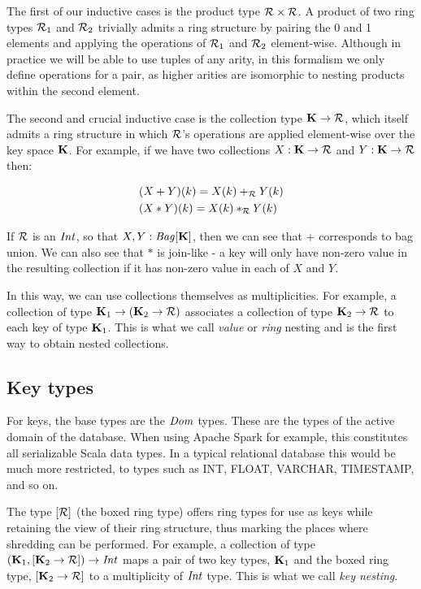 {{The first of our inductive cases is the product type $\mathcal{R} \times \mathcal{R}$. A product of two ring types $\mathcal{R}_1$ and $\mathcal{R}_2$ trivially admits a ring structure by pairing the 0 and 1 elements and applying the operations of $\mathcal{R}_1$ and $\mathcal{R}_2$ element-wise. Although in practice we will be able to use tuples of any arity, in this formalism we only define operations for a pair, as higher arities are isomorphic to nesting products within the second element.

The second and crucial inductive case is the collection type $\mathbf{K} \rightarrow \mathcal{R}$, which itself admits a ring structure in which $\mathcal{R}$'s operations are applied element-wise over the key space $\mathbf{K}$. For example, if we have two collections $X: \mathbf{K} \rightarrow \mathcal{R}$ and $Y: \mathbf{K} \rightarrow \mathcal{R}$ then:

\begin{equation*}
\begin{split}
& (X+Y)(k)  = X(k) +_{\mathcal{R}} Y(k) \\
& (X*Y)(k) = X(k) *_{\mathcal{R}} Y(k)
\end{split}
\end{equation*}

If $\mathcal{R}$ is an $\textrm{\textit{Int}}$, so that $X,Y: \textrm{\textit{Bag}}[\mathbf{K}]$, then we can see that $+$ corresponds to bag union. We can also see that $*$ is join-like - a key will only have non-zero value in the resulting collection if it has non-zero value in each of $X$ and $Y$.

In this way, we can use collections themselves as multiplicities. For example, a collection of type $\mathbf{K}_1 \rightarrow (\mathbf{K}_2 \rightarrow \mathcal{R})$ associates a collection of type $\mathbf{K}_2 \rightarrow \mathcal{R}$ to each key of type ${\mathbf{K}_1}$. This is what we call \textit{value} or \textit{ring} nesting and is the first way to obtain nested collections.

\subsection{Key types} {

For keys, the base types are the $\textrm{\textit{Dom}}$ types. These are the types of the active domain of the database. When using Apache Spark for example, this constitutes all serializable Scala data types. In a typical relational database this would be much more restricted, to types such as INT, FLOAT, VARCHAR, TIMESTAMP, and so on. 

The type $[\mathcal{R}]$ (the boxed ring type) offers ring types for use as keys while retaining the view of their ring structure, thus marking the places where shredding can be performed. For example, a collection of type $(\mathbf{K}_1,[\mathbf{K}_2 \rightarrow \mathcal{R}]) \rightarrow \textrm{\textit{Int}}$ maps a pair of two key types, $\mathbf{K}_1$ and the boxed ring type, $[\mathbf{K}_2 \rightarrow \mathcal{R}]$ to a multiplicity of $\textrm{\textit{Int}}$ type. This is what we call \textit{key nesting}. 

}}}
